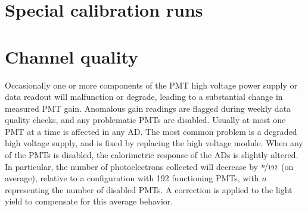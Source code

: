 \section{Special calibration runs}
\label{sec:special_calib}

\section{Channel quality}
\label{sec:channel_quality}

Occasionally one or more components of the PMT high voltage power supply
or data readout will malfunction or degrade,
leading to a substantial change in measured PMT gain.
Anomalous gain readings are flagged during weekly data quality checks,
and any problematic PMTs are disabled.
Usually at most one PMT at a time is affected in any AD.
The most common problem is a degraded high voltage supply,
and is fixed by replacing the high voltage module.
When any of the PMTs is disabled, the calorimetric response of the ADs
is slightly altered.
In particular, the number of photoelectrons collected
will decrease by $\nicefrac{n}{192}$ (on average),
relative to a configuration with \num{192} functioning PMTs,
with $n$ representing the number of disabled PMTs.
A correction is applied to the light yield to compensate for this average behavior.




